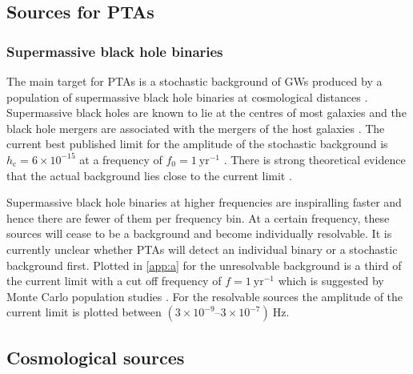 \subsection{Sources for PTAs}

\subsubsection{Supermassive black hole binaries}

The main target for PTAs is a stochastic background of GWs produced by a population of supermassive black hole binaries at cosmological distances \citep{SesanaVecchioColancino}. Supermassive black holes are known to lie at the centres of most galaxies and the black hole mergers are associated with the mergers of the host galaxies \citep{Volonteri2003,Ferrarese2005}. The current best published limit for the amplitude of the stochastic background is $h_\mathrm{c} = 6\times 10^{-15}$ at a frequency of $f_{0}=1~\mathrm{yr}^{-1}$ \citep{Haasteren}. There is strong theoretical evidence that the actual background lies close to the current limit \citep{Sesana-2012}. 

Supermassive black hole binaries at higher frequencies are inspiralling faster and hence there are fewer of them per frequency bin. At a certain frequency, these sources will cease to be a background and become individually resolvable. It is currently unclear whether PTAs will detect an individual binary or a stochastic background first. Plotted in \ref{app:a} for the unresolvable background is a third of the current limit with a cut off frequency of $f=1~\mathrm{yr}^{-1}$ which is suggested by Monte Carlo population studies \citep{SesanaVecchioColancino}. For the resolvable sources the amplitude of the current limit is plotted between $\left(3\times 10^{-9}\right.$--$\left.3\times 10^{-7}\right)~\mathrm{Hz}$.




\subsection{Cosmological sources}

